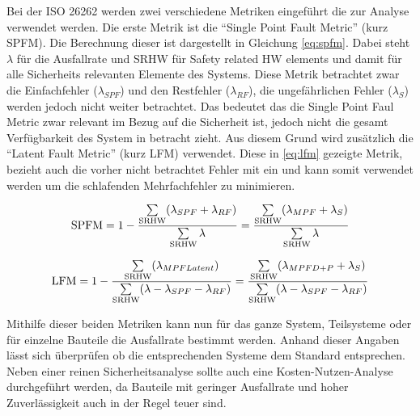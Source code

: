 \documentclass[a4paper,DIV=calc,ngerman]{scrartcl}
\begin{document}
Bei der ISO 26262 werden zwei verschiedene Metriken eingeführt die zur Analyse verwendet werden. Die erste Metrik ist die "`Single Point Fault Metric"' (kurz SPFM). Die Berechnung dieser ist dargestellt in Gleichung \ref{eq:spfm}. Dabei steht $ \lambda $ für die Ausfallrate und SRHW für Safety related HW elements und damit für alle Sicherheits relevanten Elemente des Systems. Diese Metrik betrachtet zwar die Einfachfehler ($ \lambda_{SPF} $) und den Restfehler ($ \lambda_{RF} $), die ungefährlichen Fehler ($ \lambda_{S} $) werden jedoch nicht weiter betrachtet. Das bedeutet das die Single Point Faul Metric zwar relevant im Bezug auf die Sicherheit ist, jedoch nicht die gesamt Verfügbarkeit des System in betracht zieht. Aus diesem Grund wird zusätzlich die "`Latent Fault Metric"' (kurz LFM) verwendet. Diese in \ref{eq:lfm} gezeigte Metrik, bezieht auch die vorher nicht betrachtet Fehler mit ein und kann somit verwendet werden um die schlafenden Mehrfachfehler zu minimieren. 

\begin{equation}
\textnormal{SPFM} = 1 - \frac{\sum\limits_{\textnormal{SRHW}} (\lambda_{SPF} + \lambda_{RF})}{\sum\limits_{\textnormal{SRHW}} \lambda} = \frac{\sum\limits_{\textnormal{SRHW}} (\lambda_{MPF} + \lambda_{S})}{\sum\limits_{\textnormal{SRHW}} \lambda}
\label{eq:spfm}
\end{equation}

\begin{equation}
\textnormal{LFM} = 1 - \frac{\sum\limits_{\textnormal{SRHW}} (\lambda_{MPF Latent})}{\sum\limits_{\textnormal{SRHW}} (\lambda - \lambda_{SPF} - \lambda_{RF})} = \frac{\sum\limits_{\textnormal{SRHW}} (\lambda_{MPF D+P} + \lambda_{S})}{\sum\limits_{\textnormal{SRHW}} (\lambda - \lambda_{SPF} - \lambda_{RF})}
\label{eq:lfm}
\end{equation}

Mithilfe dieser beiden Metriken kann nun für das ganze System, Teilsysteme oder für einzelne Bauteile die Ausfallrate bestimmt werden. Anhand dieser Angaben lässt sich überprüfen ob die entsprechenden Systeme dem Standard entsprechen. Neben einer reinen Sicherheitsanalyse sollte auch eine Kosten-Nutzen-Analyse durchgeführt werden, da Bauteile mit geringer Ausfallrate und hoher Zuverlässigkeit auch in der Regel teuer sind.



\end{document}
